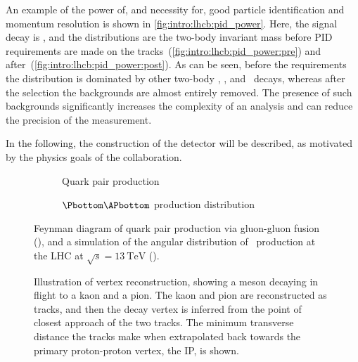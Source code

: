 An example of the power of, and necessity for, good particle identification and 
momentum resolution is shown in \cref{fig:intro:lhcb:pid_power}.
Here, the signal decay is \decay{\PBzero}{\pippim}, and the distributions are 
the two-body invariant mass before \ac{PID} requirements are made on the 
tracks~(\ref{fig:intro:lhcb:pid_power:pre}) and 
after~(\ref{fig:intro:lhcb:pid_power:post}).
As can be seen, before the requirements the distribution is dominated by other 
two-body \PBzero, \PBs, and \PLambdab\ decays, whereas after the selection the 
backgrounds are almost entirely removed.
The presence of such backgrounds significantly increases the complexity of an 
analysis and can reduce the precision of the measurement.

In the following, the construction of the detector will be described, as 
motivated by the physics goals of the collaboration.

\begin{figure}
  \begin{subfigure}[b]{0.4\textwidth}
    \centering
    
    \caption{Quark pair production}
    \label{fig:intro:lhcb:hf_production:gg_fusion}
  \end{subfigure}
  \begin{subfigure}[b]{0.6\textwidth}
    
    \caption{$\Pbottom\APbottom$ production distribution}
    \label{fig:intro:lhcb:hf_production:bbbar_angles}
  \end{subfigure}
  \caption{%
    Feynman diagram of quark pair production via gluon-gluon fusion 
    (), and a simulation of the 
    angular distribution of \bbbar\ production at the \ac{LHC} at $\sqrt{s} = 
    \SI{13}{\TeV}$ ().
  }
  \label{fig:intro:lhcb:hf_production}
\end{figure}

\begin{figure}
  \centering
  
  \caption{%
    Illustration of vertex reconstruction, showing a \PDz meson decaying in 
    flight to a kaon and a pion.
    The kaon and pion are reconstructed as tracks, and then the \PDzero decay 
    vertex is inferred from the point of closest approach of the two tracks.
    The minimum transverse distance the tracks make when extrapolated back 
    towards the primary proton-proton vertex, the \acf{IP}, is shown.
  }
  \label{fig:intro:lhcb:vertexing}
\end{figure}

